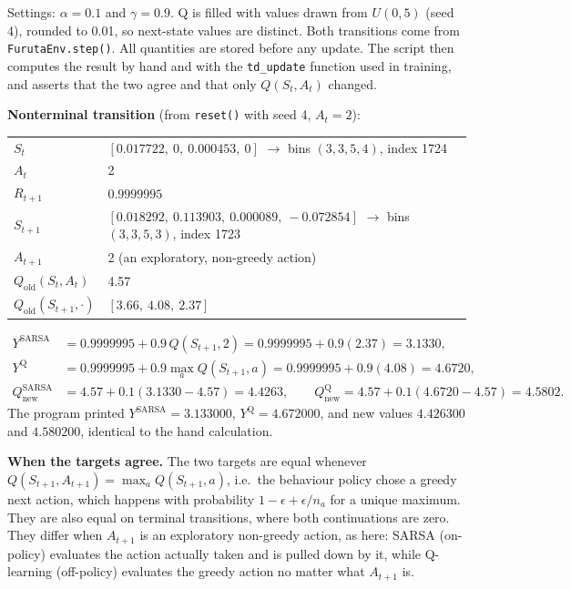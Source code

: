 \documentclass[11pt]{article}
\begin{document}
Settings: $\alpha=0.1$ and $\gamma=0.9$. Q is filled with values drawn from
$U(0,5)$ (seed 4), rounded to 0.01, so next-state values are distinct. Both
transitions come from \texttt{FurutaEnv.step()}. All quantities are stored before
any update. The script then computes the result by hand and with the
\texttt{td\_update} function used in training, and asserts that the two agree
and that only $Q(S_t,A_t)$ changed.

\textbf{Nonterminal transition} (from \texttt{reset()} with seed 4, $A_t=2$):
\begin{center}\small
\begin{tabular}{ll}\toprule
$S_t$ & $[0.017722,\ 0,\ 0.000453,\ 0]$ $\to$ bins $(3,3,5,4)$, index 1724\\
$A_t$ & 2\\
$R_{t+1}$ & $0.9999995$\\
$S_{t+1}$ & $[0.018292,\ 0.113903,\ 0.000089,\ -0.072854]$ $\to$ bins $(3,3,5,3)$, index 1723\\
$A_{t+1}$ & 2 (an exploratory, non-greedy action)\\
$Q_{\text{old}}(S_t,A_t)$ & 4.57\\
$Q_{\text{old}}(S_{t+1},\cdot)$ & $[3.66,\ 4.08,\ 2.37]$\\\bottomrule
\end{tabular}
\end{center}
\begin{align*}
Y^{\text{SARSA}} &= 0.9999995 + 0.9\,Q(S_{t+1},2) = 0.9999995+0.9(2.37) = 3.1330,\\
Y^{\text{Q}} &= 0.9999995 + 0.9\max_a Q(S_{t+1},a)= 0.9999995+0.9(4.08) = 4.6720,\\
Q^{\text{SARSA}}_{\text{new}} &= 4.57+0.1(3.1330-4.57) = 4.4263,\qquad
Q^{\text{Q}}_{\text{new}} = 4.57+0.1(4.6720-4.57) = 4.5802 .
\end{align*}
The program printed $Y^{\text{SARSA}}=3.133000$, $Y^{\text{Q}}=4.672000$, and new
values $4.426300$ and $4.580200$, identical to the hand calculation.

\textbf{When the targets agree.} The two targets are equal whenever
$Q(S_{t+1},A_{t+1})=\max_aQ(S_{t+1},a)$, i.e.\ the behaviour policy chose a greedy
next action, which happens with probability $1-\epsilon+\epsilon/n_a$ for a unique
maximum. They are also equal on terminal transitions, where both continuations
are zero. They differ when $A_{t+1}$ is an exploratory non-greedy action, as here:
SARSA (on-policy) evaluates the action actually taken and is pulled down by it,
while Q-learning (off-policy) evaluates the greedy action no matter what
$A_{t+1}$ is.
\end{document}
